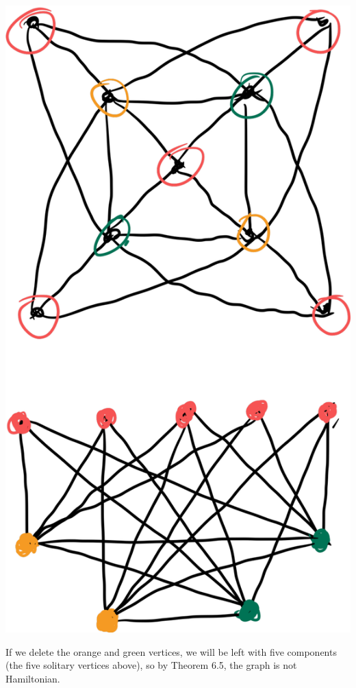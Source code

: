 \documentclass[10pt]{extarticle}
\begin{document}
\begin{problem}{11}
\begin{center}
      \includegraphics[scale=0.15]{6_11_sol.png}
    \end{center}
    If we delete the orange and green vertices, we will be left with five components (the five solitary vertices above), so by Theorem 6.5, the graph is not Hamiltonian.
  \end{problem}
\end{document}
